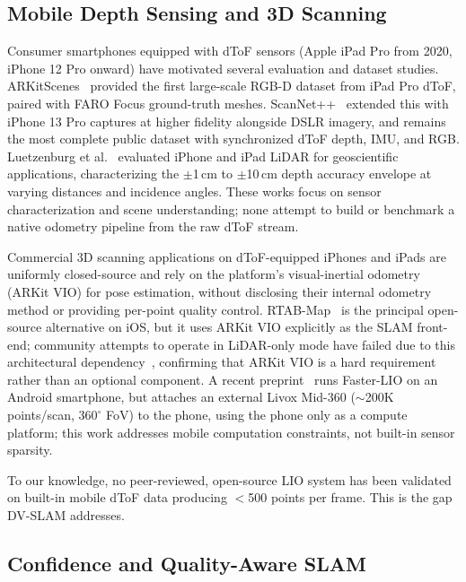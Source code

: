 \subsection{Mobile Depth Sensing and 3D Scanning}

Consumer smartphones equipped with dToF sensors (Apple iPad Pro from 2020,
iPhone 12 Pro onward) have motivated several evaluation and dataset
studies.  ARKitScenes~\cite{baruch2021arkitscenes} provided the first
large-scale RGB-D dataset from iPad Pro dToF, paired with FARO Focus
ground-truth meshes.  ScanNet++~\cite{yeshwanth2023scannetpp} extended this
with iPhone 13 Pro captures at higher fidelity alongside DSLR imagery, and
remains the most complete public dataset with synchronized dToF depth, IMU,
and RGB.  Luetzenburg et al.~\cite{luetzenburg2021evaluation} evaluated
iPhone and iPad LiDAR for geoscientific applications, characterizing the
${\pm}$1\,cm to ${\pm}$10\,cm depth accuracy envelope at varying distances
and incidence angles.  These works focus on sensor characterization and scene
understanding; none attempt to build or benchmark a native odometry pipeline
from the raw dToF stream.

Commercial 3D scanning applications on dToF-equipped iPhones and iPads are
uniformly closed-source and rely on the platform's visual-inertial odometry
(ARKit VIO) for pose estimation, without disclosing their internal odometry
method or providing per-point quality control.  RTAB-Map~\cite{labbe2019rtabmap}
is the principal open-source alternative on iOS, but it uses ARKit VIO
explicitly as the SLAM front-end; community attempts to operate in
LiDAR-only mode have failed due to this architectural
dependency~\cite{rtabmap_issue1026}, confirming that ARKit VIO is a
hard requirement rather than an optional component.  A recent
preprint~\cite{liu2025livoxphone} runs Faster-LIO on an Android smartphone,
but attaches an external Livox Mid-360 (${\sim}$200K points/scan, $360^{\circ}$
FoV) to the phone, using the phone only as a compute platform; this work
addresses mobile computation constraints, not built-in sensor sparsity.

To our knowledge, no peer-reviewed, open-source LIO system has been
validated on built-in mobile dToF data producing $<$500 points per frame.
This is the gap DV-SLAM addresses.

\subsection{Confidence and Quality-Aware SLAM}

